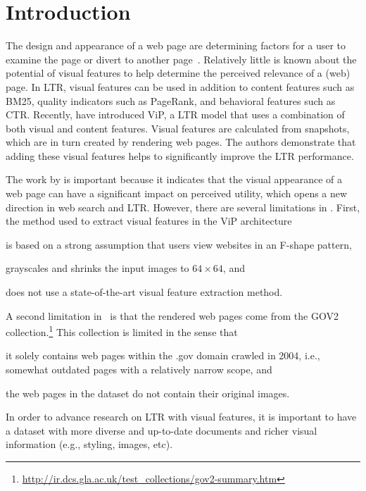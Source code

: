 
\section{Introduction}
The design and appearance of a web page are determining factors for a user to examine the page or divert to another page~\cite{nielsen1999designing,nielsen2006f,pernice2017f,wang2014eye}.
Relatively little is known about the potential of visual features to help determine the perceived relevance of a (web) page. In \acf{LTR}, visual features can be used in addition to content features such as BM25, quality indicators such as PageRank, and behavioral features such as CTR.
Recently, \citet{fan2017learning} have introduced ViP, a \ac{LTR} model that uses a combination of both visual and content features.
Visual features are calculated from snapshots, which are in turn created by rendering web pages.
The authors demonstrate that adding these visual features helps to significantly improve the \ac{LTR} performance.

The work by \citet{fan2017learning} is important because it indicates that the visual appearance of a web page can have a significant impact on perceived utility, which opens a new direction in web search and \ac{LTR}.
However, there are several limitations in \cite{fan2017learning}.
First, the method used to extract visual features in the ViP architecture
\begin{inparaenum}[(i)]
\item is based on a strong assumption that users view websites in an F-shape pattern, 
\item grayscales and shrinks the input images to $64\times64$, and
\item does not use a state-of-the-art visual feature extraction method.
\end{inparaenum}

A second limitation in~\citep{fan2017learning} is that
the rendered web pages come from the GOV2 collection.\footnote{\url{http://ir.dcs.gla.ac.uk/test_collections/gov2-summary.htm}}
This collection is limited in the sense that 
\begin{inparaenum}[(i)]
\item it solely contains web pages within the .gov domain crawled in 2004, i.e., somewhat outdated pages with a relatively narrow scope, and
\item the web pages in the dataset do not contain their original images.
\end{inparaenum}
In order to advance research on \ac{LTR} with visual features, it is important to have a dataset with more diverse and up-to-date documents and richer visual information (e.g., styling, images, etc).

